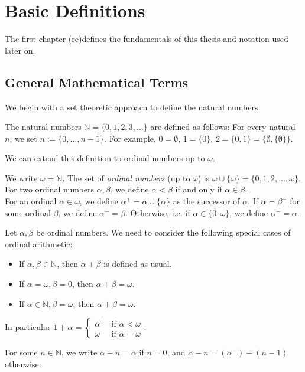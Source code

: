 \chapter{Basic Definitions}
The first chapter (re)defines the fundamentals of this thesis and notation used later on.

\section{General Mathematical Terms}
We begin with a set theoretic approach to define the natural numbers.
\begin{defn}
	The natural numbers $\mathbb{N} = \{0, 1, 2, 3, \dots\}$ are defined as follows: For every natural $n$, we set $n := \{0, \dots, n-1\}$. For example, $0 = \emptyset$, $1 = \{0\}$, $2 = \{0, 1\} = \{\emptyset, \{\emptyset\}\}$.
\end{defn}

We can extend this definition to ordinal numbers up to $\omega$.

\begin{defn}
	We write $\omega = \mathbb{N}$. The set of \emph{ordinal numbers} (up to $\omega$) is $\omega \cup \{\omega\} = \{0, 1, 2, \dots, \omega\}$. For two ordinal numbers $\alpha, \beta$, we define $\alpha < \beta$ if and only if $\alpha \in \beta$. \\
	For an ordinal $\alpha \in \omega$, we define $\alpha^+ = \alpha \cup \{\alpha\}$ as the successor of $\alpha$. If $\alpha = \beta^+$ for some ordinal $\beta$, we define $\alpha^- = \beta$. Otherwise, i.e. if $\alpha \in \{0, \omega\}$, we define $\alpha^- = \alpha$.
\end{defn}

\begin{defn}
	Let $\alpha, \beta$ be ordinal numbers. We need to consider the following special cases of ordinal arithmetic:
	\begin{itemize}
		\item If $\alpha, \beta \in \mathbb{N}$, then $\alpha + \beta$ is defined as usual.
		\item If $\alpha = \omega, \beta = 0$, then $\alpha + \beta = \omega$.
		\item If $\alpha \in \mathbb{N}, \beta = \omega$, then $\alpha + \beta = \omega$.
	\end{itemize}
	In particular $1 + \alpha = \begin{cases}\alpha^+ & \text{if } \alpha < \omega \\ \omega & \text{if } \alpha = \omega\end{cases}$.
	
	For some $n \in \mathbb{N}$, we write $\alpha - n = \alpha$ if $n = 0$, and $\alpha - n = (\alpha^-) - (n-1)$ otherwise.
\end{defn}


